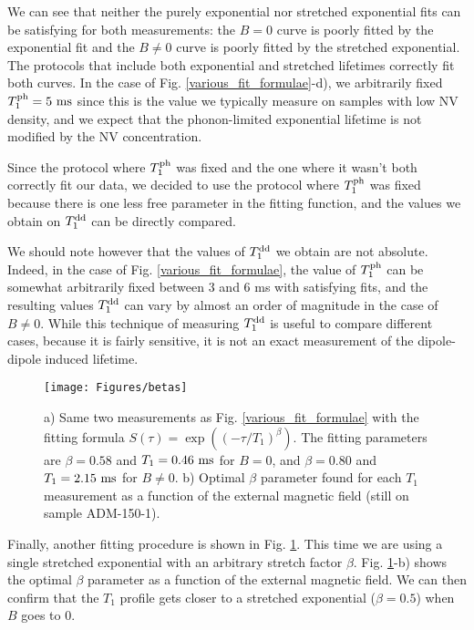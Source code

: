 \documentclass[a4paper,11pt]{report}
\begin{document}
We can see that neither the purely exponential nor stretched exponential fits can be satisfying for both measurements: the $B=0$ curve is poorly fitted by the exponential fit and the $B \neq 0$ curve is poorly fitted by the stretched exponential. The protocols that include both exponential and stretched lifetimes correctly fit both curves. In the case of Fig. \ref{various_fit_formulae}-d), we arbitrarily fixed $T_1^{\rm ph}=5\ \rm ms$ since this is the value we typically measure on samples with low NV density, and we expect that the phonon-limited exponential lifetime is not modified by the NV concentration.

Since the protocol where $T_1^{\rm ph}$ was fixed and the one where it wasn't both correctly fit our data, we decided to use the protocol where $T_1^{\rm ph}$ was fixed because there is one less free parameter in the fitting function, and the values we obtain on $T_1^{\rm dd}$ can be directly compared. 

We should note however that the values of $T_1^{\rm dd}$ we obtain are not absolute. Indeed, in the case of Fig. \ref{various_fit_formulae}, the value of $T_1^{\rm ph}$ can be somewhat arbitrarily fixed between 3 and 6 ms with satisfying fits, and the resulting values $T_1^{\rm dd}$ can vary by almost an order of magnitude in the case of $B\neq0$. While this technique of measuring $T_1^{\rm dd}$ is useful to compare different cases, because it is fairly sensitive, it is not an exact measurement of the dipole-dipole induced lifetime.

\begin{figure}[h]
\centering
\texttt{[image: Figures/betas]}
\caption{a) Same two measurements as Fig. \ref{various_fit_formulae} with the fitting formula $S(\tau)=\exp ((-\tau/T_1)^{\beta})$. The fitting parameters are $\beta=0.58$ and $T_1=0.46\ \rm ms$ for $B=0$, and $\beta=0.80$ and $T_1=2.15\ \rm ms$ for $B\neq0$. b) Optimal $\beta$ parameter found for each $T_1$ measurement as a function of the external magnetic field (still on sample ADM-150-1).}
\label{betas}
\end{figure}

Finally, another fitting procedure is shown in Fig. \ref{betas}. This time we are using a single stretched exponential with an arbitrary stretch factor $\beta$. Fig. \ref{betas}-b) shows the optimal $\beta$ parameter as a function of the external magnetic field. We can then confirm that the $T_1$ profile gets closer to a stretched exponential ($\beta=0.5$) when $B$ goes to 0. 
\end{document}
